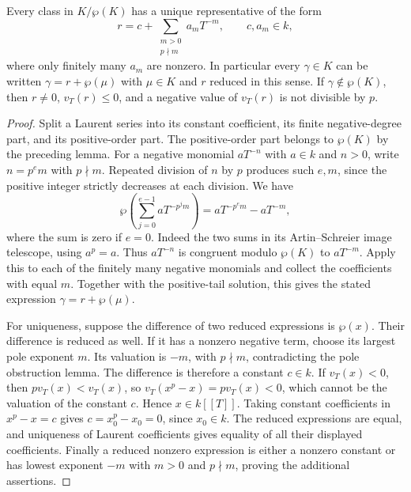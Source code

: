 \begin{lemma}
\label{lem:artin-schreier-reduced-representative}
\leanok
Every class in $K/\wp(K)$ has a unique representative of the
form
\[
 r=c+\sum_{\substack{m>0\\p\nmid m}}a_m T^{-m},
 \qquad c,a_m\in k,
\]
where only finitely many $a_m$ are nonzero.
In particular every $\gamma\in K$ can be written
$\gamma=r+\wp(\mu)$ with $\mu\in K$ and $r$ reduced in
this sense. If $\gamma\notin\wp(K)$, then $r\ne0$,
$v_T(r)\le0$, and a negative value of $v_T(r)$ is not
divisible by $p$.
\end{lemma}

\begin{proof}
Split a Laurent series into its constant coefficient, its
finite negative-degree part, and its positive-order part.
The positive-order part belongs to $\wp(K)$ by the preceding
lemma. For a negative monomial $aT^{-n}$ with $a\in k$ and
$n>0$, write $n=p^e m$ with $p\nmid m$. Repeated division
of $n$ by $p$ produces such $e,m$, since the positive integer
strictly decreases at each division. We have
\[
 \wp\left(\sum_{j=0}^{e-1}aT^{-p^j m}\right)
   =aT^{-p^e m}-aT^{-m},
\]
where the sum is zero if $e=0$.
Indeed the two sums in its Artin--Schreier image telescope,
using $a^p=a$. Thus $aT^{-n}$ is congruent modulo
$\wp(K)$ to $aT^{-m}$. Apply this to each of the finitely
many negative monomials and collect the coefficients with
equal $m$. Together with the positive-tail solution, this
gives the stated expression $\gamma=r+\wp(\mu)$.

For uniqueness, suppose the difference of two reduced
expressions is $\wp(x)$. Their difference is reduced as
well. If it has a nonzero negative term, choose its largest
pole exponent $m$. Its valuation is $-m$, with $p\nmid m$,
contradicting the pole obstruction lemma.
The difference is therefore a constant $c\in k$.
If $v_T(x)<0$, then $p v_T(x)<v_T(x)$, so
$v_T(x^p-x)=p v_T(x)<0$, which cannot be the valuation of
the constant $c$. Hence $x\in k[[T]]$.
Taking constant coefficients in $x^p-x=c$ gives
$c=x_0^p-x_0=0$, since $x_0\in k$.
The reduced expressions are equal, and uniqueness of Laurent
coefficients gives equality of all their displayed
coefficients. Finally a reduced nonzero expression is either
a nonzero constant or has lowest exponent $-m$ with
$m>0$ and $p\nmid m$, proving the additional assertions.
\end{proof}


